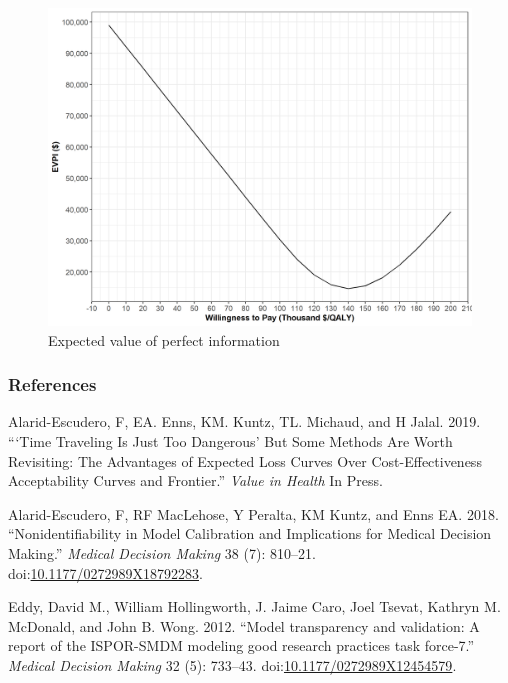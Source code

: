 \documentclass[]{article}
\begin{document}
\begin{figure}
\centering
\includegraphics{../figs/05c_evpi.png}
\caption{Expected value of perfect information \label{fig:05c_evpi}}
\end{figure}

\newpage

\subsubsection*{References}\label{references}

\hypertarget{refs}{}
\hypertarget{ref-Alarid-Escudero2019}{}
Alarid-Escudero, F, EA. Enns, KM. Kuntz, TL. Michaud, and H Jalal. 2019.
```Time Traveling Is Just Too Dangerous' But Some Methods Are Worth
Revisiting: The Advantages of Expected Loss Curves Over
Cost-Effectiveness Acceptability Curves and Frontier.'' \emph{Value in
Health} In Press.

\hypertarget{ref-Alarid-Escudero2018b}{}
Alarid-Escudero, F, RF MacLehose, Y Peralta, KM Kuntz, and Enns EA.
2018. ``Nonidentifiability in Model Calibration and Implications for
Medical Decision Making.'' \emph{Medical Decision Making} 38 (7):
810--21.
doi:\href{https://doi.org/10.1177/0272989X18792283}{10.1177/0272989X18792283}.

\hypertarget{ref-Eddy2012}{}
Eddy, David M., William Hollingworth, J. Jaime Caro, Joel Tsevat,
Kathryn M. McDonald, and John B. Wong. 2012. ``Model transparency and
validation: A report of the ISPOR-SMDM modeling good research practices
task force-7.'' \emph{Medical Decision Making} 32 (5): 733--43.
doi:\href{https://doi.org/10.1177/0272989X12454579}{10.1177/0272989X12454579}.
\end{document}
